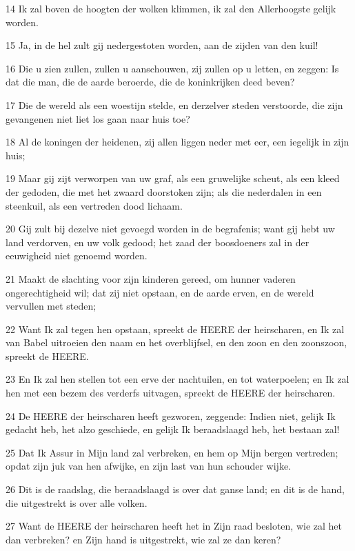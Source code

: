 \par 14 Ik zal boven de hoogten der wolken klimmen, ik zal den Allerhoogste gelijk worden.
\par 15 Ja, in de hel zult gij nedergestoten worden, aan de zijden van den kuil!
\par 16 Die u zien zullen, zullen u aanschouwen, zij zullen op u letten, en zeggen: Is dat die man, die de aarde beroerde, die de koninkrijken deed beven?
\par 17 Die de wereld als een woestijn stelde, en derzelver steden verstoorde, die zijn gevangenen niet liet los gaan naar huis toe?
\par 18 Al de koningen der heidenen, zij allen liggen neder met eer, een iegelijk in zijn huis;
\par 19 Maar gij zijt verworpen van uw graf, als een gruwelijke scheut, als een kleed der gedoden, die met het zwaard doorstoken zijn; als die nederdalen in een steenkuil, als een vertreden dood lichaam.
\par 20 Gij zult bij dezelve niet gevoegd worden in de begrafenis; want gij hebt uw land verdorven, en uw volk gedood; het zaad der boosdoeners zal in der eeuwigheid niet genoemd worden.
\par 21 Maakt de slachting voor zijn kinderen gereed, om hunner vaderen ongerechtigheid wil; dat zij niet opstaan, en de aarde erven, en de wereld vervullen met steden;
\par 22 Want Ik zal tegen hen opstaan, spreekt de HEERE der heirscharen, en Ik zal van Babel uitroeien den naam en het overblijfsel, en den zoon en den zoonszoon, spreekt de HEERE.
\par 23 En Ik zal hen stellen tot een erve der nachtuilen, en tot waterpoelen; en Ik zal hen met een bezem des verderfs uitvagen, spreekt de HEERE der heirscharen.
\par 24 De HEERE der heirscharen heeft gezworen, zeggende: Indien niet, gelijk Ik gedacht heb, het alzo geschiede, en gelijk Ik beraadslaagd heb, het bestaan zal!
\par 25 Dat Ik Assur in Mijn land zal verbreken, en hem op Mijn bergen vertreden; opdat zijn juk van hen afwijke, en zijn last van hun schouder wijke.
\par 26 Dit is de raadslag, die beraadslaagd is over dat ganse land; en dit is de hand, die uitgestrekt is over alle volken.
\par 27 Want de HEERE der heirscharen heeft het in Zijn raad besloten, wie zal het dan verbreken? en Zijn hand is uitgestrekt, wie zal ze dan keren?
